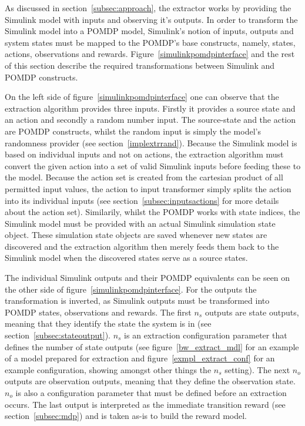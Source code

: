 As discussed in section~\ref{subsec:approach}, the extractor works by providing the Simulink model with inputs and observing it's outputs. In order to transform the Simulink model into a POMDP model, Simulink's notion of inputs, outputs and system states must be mapped to the POMDP's base constructs, namely, states, actions, observations and rewards. Figure~\ref{simulinkpomdpinterface} and the rest of this section describe the required transformations between Simulink and POMDP constructs.

On the left side of figure~\ref{simulinkpomdpinterface} one can observe that the extraction algorithm provides three inputs. Firstly it provides a source state and an action and secondly a random number input. The source-state and the action are POMDP constructs, whilst the random input is simply the model's randomness provider (see section~\ref{implextrrand}). Because the Simulink model is based on individual inputs and not on actions, the extraction algorithm must convert the given action into a set of valid Simulink inputs before feeding these to the model. Because the action set is created from the cartesian product of all permitted input values, the action to input transformer simply splits the action into its individual inputs (see section~\ref{subsec:inputsactions} for more details about the action set). Similarily, whilst the POMDP works with state indices, the Simulink model must be provided with an actual Simulink simulation state object. These simulation state objects are saved whenever new states are discovered and the extraction algorithm then merely feeds them back to the Simulink model when the discovered states serve as a source states.

The individual Simulink outputs and their POMDP equivalents can be seen on the other side of figure~\ref{simulinkpomdpinterface}. For the outputs the transformation is inverted, as Simulink outputs must be transformed into POMDP states, observations and rewards. The first $n_s$ outputs are state outputs, meaning that they identify the state the system is in (see section~\ref{subsec:stateoutput}). $n_s$ is an extraction configuration parameter that defines the number of state outputs (see figure~\ref{bw_extract_mdl} for an example of a model prepared for extraction and figure~\ref{exmpl_extract_conf} for an example configuration, showing amongst other things the $n_s$ setting). The next $n_o$ outputs are observation outputs, meaning that they define the observation state. $n_o$ is also a configuration parameter that must be defined before an extraction occurs. The last output is interpreted as the immediate transition reward (see section~\ref{subsec:mdp}) and is taken as-is to build the reward model.

